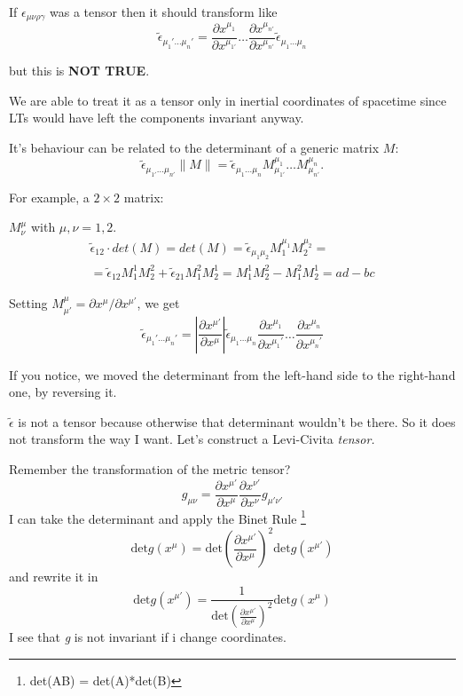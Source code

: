 If $\epsilon_{\mu \nu \rho \gamma }$ was a tensor then it should transform like
\begin{equation}
\tilde{\epsilon}_{\mu_{1}' \ldots \mu_{n}'} = \frac{\partial x^{\mu_{1}}}{\partial x^{\mu_{1'}}} \ldots \frac{\partial x^{\mu_{n'}}}{\partial x^{\mu_{n'}}} \tilde{\epsilon}_{\mu_{1}\ldots \mu_{n}}
\end{equation}

but this is \textbf{NOT TRUE}.\par
 

We are able to treat it as a tensor only in inertial coordinates of spacetime since LTs would have left the components invariant anyway.\par
It's behaviour can be related to the determinant of a generic matrix $M$:
\[
\tilde{\epsilon}_{\mu_{1'}\ldots \mu_{n'}} \|M\| = \tilde{\epsilon}_{\mu_{1}\ldots \mu_{n}} M^{\mu_{1}}_{\mu_{1'}} \ldots M^{\mu_{n}}_{\mu_{n'}}.
\]

For example, a $2\times 2$ matrix:\par
$M^{\mu }_{\nu }$ with $\mu ,\nu =1,2$.
\begin{gather}
	\tilde{\epsilon }_{12} \cdot det\left( M \right) = det\left( M \right)= \tilde{\epsilon }_{\mu_{1}\mu_{2}} M^{\mu_{1}}_{1} M^{\mu_{2}}_{2} = \\
	= \tilde{\epsilon }_{12} M^{1}_{1} M^{2}_{2} + \tilde{\epsilon }_{21}M^{2}_{1}M^{1}_{2} = M^{1}_{1}M^{2}_{2} - M^{2}_{1}M^{1}_{2} = ad- bc
\end{gather}\par

Setting $M^{\mu }_{\mu '} = \partial x^{\mu } / \partial x^{\mu '} $, we get
\[
\tilde{\epsilon }_{\mu_{1}' \ldots \mu_{n}'} = \left| \frac{\partial x^{\mu '}}{\partial x^{\mu }} \right| \tilde{\epsilon }_{\mu _{1}\ldots \mu_{n}} \frac{\partial x^{\mu _{1}}}{\partial x^{\mu _{1}'}} \ldots \frac{\partial x^{\mu _{n}}}{\partial x^{\mu_{n}'}} 
\]

If you notice, we moved the determinant from the left-hand side to the right-hand one, by reversing it.\par
$\tilde{\epsilon }$ is not a tensor because otherwise that determinant wouldn't be there. So it does not transform the way I want. Let's construct a Levi-Civita \emph{tensor.}\par
Remember the transformation of the metric tensor?
\[
g_{\mu \nu }= \frac{\partial x^{\mu '}}{\partial x^{\mu }} \frac{\partial x^{\nu '}}{\partial x^{\nu }} g_{\mu '\nu '}
\]
I can take the determinant and apply the Binet Rule \footnote{det(AB) = det(A)*det(B)}
\[
	\text{det} g\left( x^{\mu } \right) = \text{det}\left( \frac{\partial x^{\mu '}}{\partial x^{\mu }}  \right)^{2} \text{det} g\left( x^{\mu '} \right)
\]
and rewrite it in 
\[
	\text{det} g\left( x^{\mu '} \right) = \frac{1}{ \text{det}\left( \frac{\partial x^{\mu '}}{\partial x^{\mu }}  \right)^{2}} \text{det} g\left( x^{\mu } \right)
\]
I see that \emph{g} is not invariant if i change coordinates.


